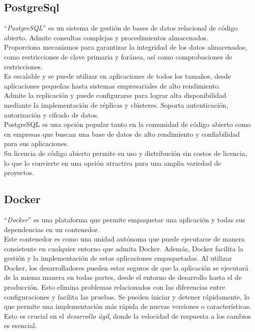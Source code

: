 \subsection{PostgreSql~\cite{juba2015learning}}
``\emph{PostgreSQL}'' es un sistema de gestión de bases de datos relacional de código abierto. 
Admite consultas complejas y procedimientos almacenados.\\
Proporciona mecanismos para garantizar la integridad de los datos almacenados, 
como restricciones de clave primaria y foránea, así como comprobaciones de restricciones.\\
Es escalable y se puede utilizar en aplicaciones de todos los tamaños, 
desde aplicaciones pequeñas hasta sistemas empresariales de alto rendimiento.\\
Admite la replicación y puede configurarse para lograr alta disponibilidad mediante 
la implementación de réplicas y clústeres.
Soporta autenticación, autorización y cifrado de datos.\\
PostgreSQL es una opción popular tanto en la comunidad de código abierto como 
en empresas que buscan una base de datos de alto rendimiento y confiabilidad para sus aplicaciones.\\
Su licencia de código abierto permite su uso y distribución sin costos de licencia, 
lo que lo convierte en una opción atractiva para una amplia variedad de proyectos.

\subsection{Docker~\cite{garzas2105docker}}
``\emph{Docker}'' es una plataforma que permite empaquetar una aplicación y 
todas sus dependencias en un contenedor.\\
Este contenedor es como una unidad autónoma que puede ejecutarse de manera 
consistente en cualquier entorno que admita Docker. 
Además, Docker facilita la gestión y la implementación de estas aplicaciones empaquetadas.
Al utilizar Docker, los desarrolladores pueden estar seguros de que la aplicación 
se ejecutará de la misma manera en todas partes, desde el entorno de desarrollo hasta el de producción. 
Esto elimina problemas relacionados con las diferencias entre configuraciones y facilita las pruebas.
Se pueden iniciar y detener rápidamente, lo que permite una implementación más rápida de 
nuevas versiones o características. \\
Esto es crucial en el \emph{desarrollo ágil}, donde la velocidad de respuesta a los cambios es esencial.


